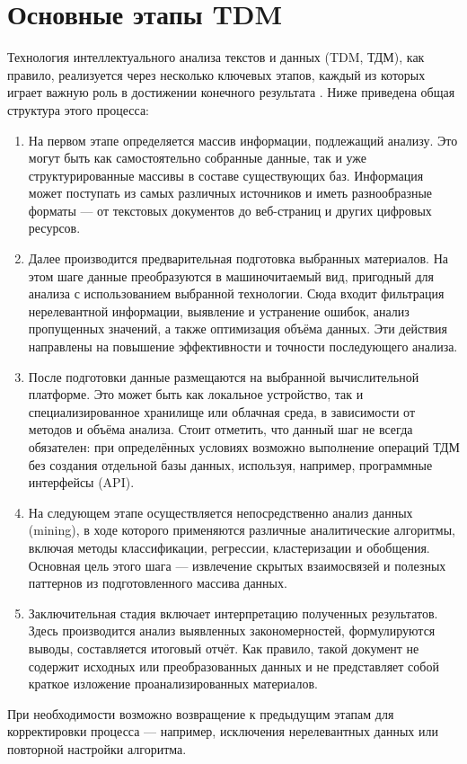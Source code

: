 
\section*{Основные этапы TDM}

Технология интеллектуального анализа текстов и данных (TDM, ТДМ), как правило,
реализуется через несколько ключевых этапов, каждый из которых играет важную
роль в достижении конечного результата \cite{triaille2014tdm}. Ниже приведена
общая структура этого процесса:

\begin{enumerate}
    \item На первом этапе определяется массив информации, подлежащий анализу.
    Это могут быть как самостоятельно собранные данные, так и уже
    структурированные массивы в составе существующих баз. Информация может
    поступать из самых различных источников и иметь разнообразные форматы ---
    от текстовых документов до веб-страниц и других цифровых ресурсов.

    \item Далее производится предварительная подготовка выбранных материалов.
    На этом шаге данные преобразуются в машиночитаемый вид, пригодный для
    анализа с использованием выбранной технологии. Сюда входит фильтрация
    нерелевантной информации, выявление и устранение ошибок, анализ пропущенных
    значений, а также оптимизация объёма данных. Эти действия направлены на
    повышение эффективности и точности последующего анализа.

    \item После подготовки данные размещаются на выбранной вычислительной
    платформе. Это может быть как локальное устройство, так и
    специализированное хранилище или облачная среда, в зависимости от методов и
    объёма анализа. Стоит отметить, что данный шаг не всегда обязателен: при
    определённых условиях возможно выполнение операций ТДМ без создания
    отдельной базы данных, используя, например, программные интерфейсы (API).

    \item На следующем этапе осуществляется непосредственно анализ данных
    (mining), в ходе которого применяются различные аналитические алгоритмы,
    включая методы классификации, регрессии, кластеризации и обобщения.
    Основная цель этого шага --- извлечение скрытых взаимосвязей и полезных
    паттернов из подготовленного массива данных.

    \item Заключительная стадия включает интерпретацию полученных результатов.
    Здесь производится анализ выявленных закономерностей, формулируются выводы,
    составляется итоговый отчёт. Как правило, такой документ не содержит
    исходных или преобразованных данных и не представляет собой краткое
    изложение проанализированных материалов.
\end{enumerate}

При необходимости возможно возвращение к предыдущим этапам для корректировки
процесса --- например, исключения нерелевантных данных или повторной настройки
алгоритма.

